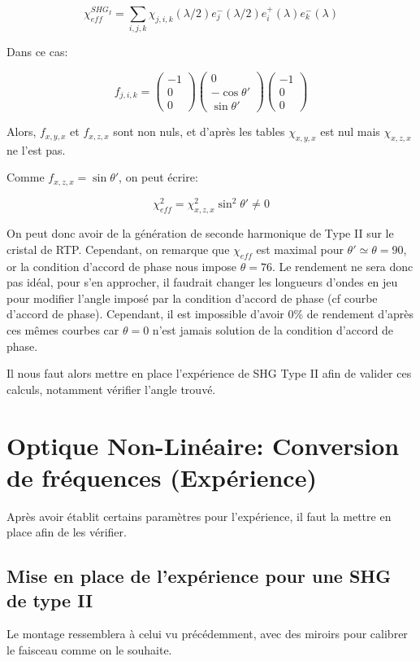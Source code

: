 \documentclass[a4paper,11pt]{report}
\begin{document}
\[\chi_{eff}^{SHG_I}=\sum_{i,j,k}\chi_{j,i,k}(\lambda/2)e^-_j(\lambda/2)e^+_i(\lambda)e^-_k(\lambda)\]

Dans ce cas:

\[f_{j,i,k}=\begin{pmatrix}-1\\0\\0\end{pmatrix}\begin{pmatrix}0\\-\cos\theta'\\\sin\theta'\end{pmatrix}\begin{pmatrix}-1\\0\\0\end{pmatrix}\]

Alors, $f_{x,y,x}$ et $f_{x,z,x}$ sont non nuls, et d'après les tables $\chi_{x,y,x}$ est nul mais $\chi_{x,z,x}$ ne l'est pas. 

Comme $f_{x,z,x}=\sin\theta'$, on peut écrire:

\[\chi_{eff}^2=\chi_{x,z,x}^2\sin^2\theta'\neq 0\]

On peut donc avoir de la génération de seconde harmonique de Type II sur le cristal de RTP. Cependant, on remarque que $\chi_{eff}$ est maximal pour $\theta'\simeq\theta=90$\textdegree, or la condition d'accord de phase nous impose $\theta=76$\textdegree. Le rendement ne sera donc pas idéal, pour s'en approcher, il faudrait changer les longueurs d'ondes en jeu pour modifier l'angle imposé par la condition d'accord de phase (cf courbe d'accord de phase). Cependant, il est impossible d'avoir 0\% de rendement d'après ces mêmes courbes car $\theta=0$ n'est jamais solution de la condition d'accord de phase.

Il nous faut alors mettre en place l'expérience de SHG Type II afin de valider ces calculs, notamment vérifier l'angle trouvé.

\chapter{Optique Non-Linéaire: Conversion de fréquences (Expérience)} \label{ONLExp}
Après avoir établit certains paramètres pour l'expérience, il faut la mettre en place afin de les vérifier.
\section{Mise en place de l'expérience pour une SHG de type II}
Le montage ressemblera à celui vu précédemment, avec des miroirs pour calibrer le faisceau comme on le souhaite. 
\end{document}
